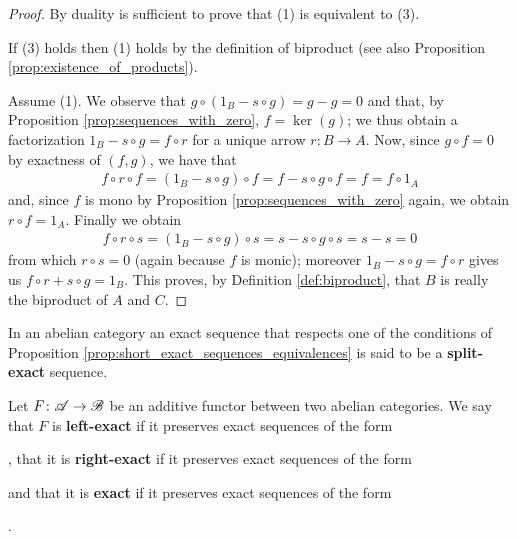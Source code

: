 \begin{proof}
  By duality is sufficient to prove that (1) is equivalent to (3).

  If (3) holds then (1) holds by the definition of biproduct (see also Proposition \ref{prop:existence_of_products}).

  Assume (1). We observe that \(g\circ(1_B - s\circ g) = g - g = 0\) and that, by Proposition \ref{prop:sequences_with_zero}, \(f = \ker(g)\); we thus obtain a factorization \(1_B-s\circ g = f\circ r\) for a unique arrow \(r\colon B\to A\). Now, since \(g\circ f = 0\) by exactness of \((f, g)\), we have that
  \begin{gather*}
    f\circ r\circ f = (1_B - s\circ g)\circ f = f - s\circ g\circ f = f = f\circ 1_A
  \end{gather*}
  and, since \(f\) is mono by Proposition \ref{prop:sequences_with_zero} again, we obtain \(r\circ f = 1_A\). Finally we obtain
  \begin{gather*}
    f\circ r\circ s = (1_B - s\circ g)\circ s = s - s\circ g\circ s = s - s = 0
  \end{gather*}
  from which \(r\circ s = 0\) (again because \(f\) is monic); moreover \(1_B - s\circ g = f\circ r\) gives us \(f\circ r + s\circ g = 1_B\). This proves, by Definition \ref{def:biproduct}, that \(B\) is really the biproduct of \(A\) and \(C\).
\end{proof}

\begin{definition}
  \label{def:split_exact_sequence}
  In an abelian category an exact sequence that respects one of the conditions of Proposition \ref{prop:short_exact_sequences_equivalences} is said to be a {\bf split-exact} sequence.
\end{definition}

\begin{definition}
  \label{def:exact_functor}
  Let \(F\colon {\mathscr A}\to {\mathscr B}\) be an additive functor between two abelian categories. We say that \(F\) is {\bf left-exact} if it preserves exact sequences of the form , that it is {\bf right-exact} if it preserves exact sequences of the form  and that it is {\bf exact} if it preserves exact sequences of the form .
\end{definition}

